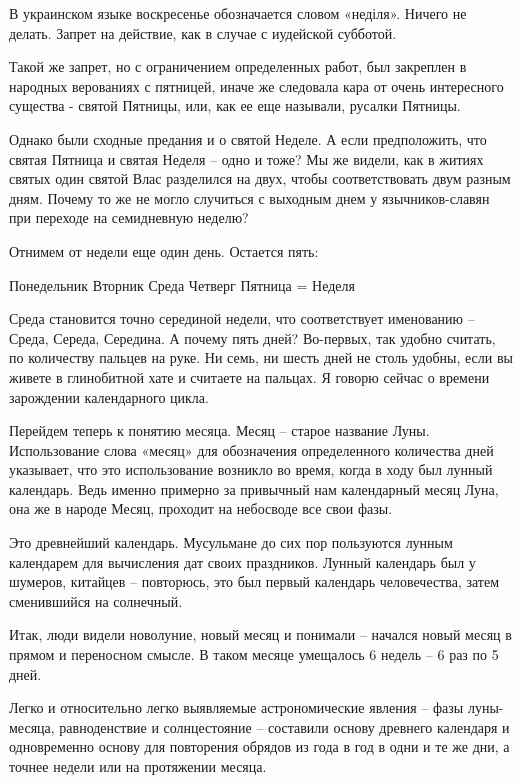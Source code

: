 В украинском языке воскресенье обозначается словом «неділя». Ничего не делать. Запрет на действие, как в случае с иудейской субботой.

   Такой же запрет, но с ограничением определенных работ, был закреплен в народных верованиях с пятницей, иначе же следовала кара от очень интересного существа - святой Пятницы, или, как ее еще называли, русалки Пятницы.

Однако были сходные предания и о святой Неделе. А если предположить, что святая Пятница и святая Неделя – одно и тоже? Мы же видели, как в житиях святых один святой Влас разделился на двух, чтобы соответствовать двум разным дням. Почему то же не могло случиться с выходным днем у язычников-славян при переходе на семидневную неделю?

Отнимем от недели еще один день. Остается пять:\newline 

\noindent Понедельник\newline
Вторник\newline
Среда\newline
Четверг\newline
Пятница = Неделя\newline

Среда становится точно серединой недели, что соответствует именованию – Среда, Середа, Середина. А почему пять дней? Во-первых, так удобно считать, по количеству пальцев на руке. Ни семь, ни шесть дней не столь удобны, если вы живете в глинобитной хате и считаете на пальцах. Я говорю сейчас о времени зарождении календарного цикла.

   Перейдем теперь к понятию месяца. Месяц – старое название Луны. Использование слова «месяц» для обозначения определенного количества дней указывает, что это использование возникло во время, когда в ходу был лунный календарь. Ведь именно примерно за привычный нам календарный месяц Луна, она же в народе Месяц, проходит на небосводе все свои фазы.

   Это древнейший календарь. Мусульмане до сих пор пользуются лунным календарем для вычисления дат своих праздников. Лунный календарь был у шумеров, китайцев – повторюсь, это был первый календарь человечества, затем сменившийся на солнечный.

   Итак, люди видели новолуние, новый месяц и понимали – начался новый месяц в прямом и переносном смысле. В таком месяце умещалось 6 недель – 6 раз по 5 дней.

   Легко и относительно легко выявляемые астрономические явления – фазы луны-месяца, равноденствие и солнцестояние –  составили основу древнего календаря и одновременно основу для повторения обрядов из года в год в одни и те же дни, а точнее недели или на протяжении месяца.

